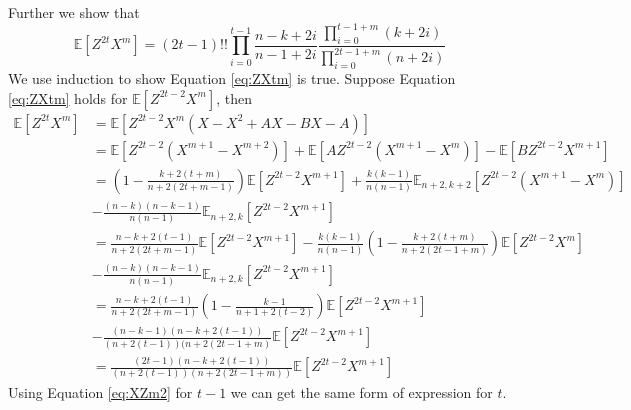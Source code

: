 \documentclass{article}
\def\E{\mathbb{E}}
\begin{document}
Further we show that
\begin{equation}\label{eq:ZXtm}
\E[Z^{2t} X^m] = (2t-1)!! \prod_{i=0}^{t-1}\frac{n-k+2i}{n-1+2i}
\frac{\prod_{i=0}^{t-1+m} (k+2i)}{\prod_{i=0}^{2t-1+m}(n+2i)}
\end{equation}
We use induction to show Equation \eqref{eq:ZXtm} is true.
Suppose Equation \eqref{eq:ZXtm} holds for $\E[Z^{2t-2}X^m]$, then
\begin{align*}
\E[Z^{2t}X^m] &= \E[Z^{2t-2}X^m(X-X^2+AX-BX-A)] \\
&= \E[Z^{2t-2}(X^{m+1} - X^{m+2})] +
\E[A Z^{2t-2} (X^{m+1} - X^m)] - \E[BZ^{2t-2} X^{m+1}] \\
&= \left(1-\frac{k+2(t+m)}{n+2(2t+m-1)}\right)\E[Z^{2t-2}X^{m+1}] +
\frac{k(k-1)}{n(n-1)}\E_{n+2,k+2}[Z^{2t-2}(X^{m+1} - X^m)] \\
&-\frac{(n-k)(n-k-1)}{n(n-1)}\E_{n+2,k}[Z^{2t-2}X^{m+1}]\\
&=\frac{n-k+2(t-1)}{n+2(2t+m-1)}\E[Z^{2t-2}X^{m+1}] -
\frac{k(k-1)}{n(n-1)}\left(1-\frac{k+2(t+m)}{n+2(2t-1+m)}\right)
\E[Z^{2t-2}X^m] \\
&-\frac{(n-k)(n-k-1)}{n(n-1)}\E_{n+2,k}[Z^{2t-2}X^{m+1}]\\
&=\frac{n-k+2(t-1)}{n+2(2t+m-1)}
\left(1-\frac{k-1}{n+1+2(t-2)}\right)\E[Z^{2t-2}X^{m+1}] \\
&-\frac{(n-k-1)(n-k+2(t-1))}{(n+2(t-1))(n+2(2t-1+m)}\E[Z^{2t-2}X^{m+1}] \\
&=\frac{(2t-1)(n-k+2(t-1))}{(n+2(t-1)) (n+2(2t-1+m))}\E[Z^{2t-2}X^{m+1}]
\end{align*}
Using Equation \eqref{eq:XZm2} for $t-1$
we can get the same form of expression for $t$.



\end{document}
